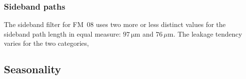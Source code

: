 \noindent


\subsubsection{Sideband paths}
\label{FM08:sbpath}
The sideband filter for FM~08 uses two more or less distinct values for the
sideband path length in equal measure: $97\,\mathrm{\mu m}$ and
$76\,\mu\mathrm{m}$.  The leakage tendency varies for the two categories,


\subsection{Seasonality}
\label{FM08:seasonality}
